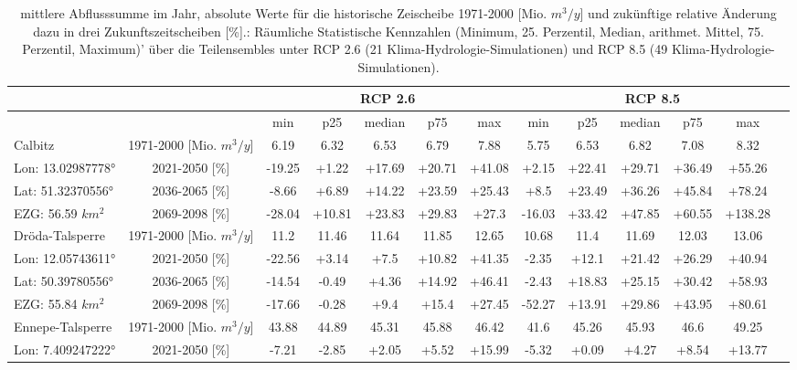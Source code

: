 \renewcommand{\arraystretch}{1.2}
\addtolength{\tabcolsep}{-5.9pt}
\scriptsize
\begin{longtable}{@{\extracolsep{\fill}}lc|ccccc||cccccc}
\caption{mittlere Abflusssumme im Jahr, absolute Werte für die historische Zeischeibe 1971-2000 [Mio. $m^3/y$] und zukünftige relative Änderung dazu in drei Zukunftszeitscheiben [\%].: Räumliche Statistische Kennzahlen (Minimum, 25. Perzentil, Median, arithmet. Mittel, 75. Perzentil, Maximum)' über die Teilensembles unter RCP 2.6 (21 Klima-Hydrologie-Simulationen) und RCP 8.5 (49 Klima-Hydrologie-Simulationen).}\\  \hline
\multicolumn{2}{c}{} & \multicolumn{5}{c||}{RCP 2.6}  & \multicolumn{6}{c}{RCP 8.5}\\ \hline
\multicolumn{2}{c|}{} & min & p25 & median & p75 & max & min & p25 & median & p75 & max\\ 
\hline 
Calbitz & 1971-2000 [Mio. $m^3/y$]  & 6.19 & 6.32 & 6.53 & 6.79 & 7.88 & 5.75 & 6.53 & 6.82 & 7.08 & 8.32 & \\ 
\cline{2-13} 
Lon: 13.02987778° & 2021-2050 [\%]  & -19.25 & +1.22 & +17.69 & +20.71 & +41.08 & +2.15 & +22.41 & +29.71 & +36.49 & +55.26 & \\ 
Lat: 51.32370556° & 2036-2065 [\%]  & -8.66 & +6.89 & +14.22 & +23.59 & +25.43 & +8.5 & +23.49 & +36.26 & +45.84 & +78.24 & \\ 
EZG: 56.59 $km^2$ & 2069-2098 [\%]  & -28.04 & +10.81 & +23.83 & +29.83 & +27.3 & -16.03 & +33.42 & +47.85 & +60.55 & +138.28 & \\ 
\hline 
Dröda-Talsperre & 1971-2000 [Mio. $m^3/y$]  & 11.2 & 11.46 & 11.64 & 11.85 & 12.65 & 10.68 & 11.4 & 11.69 & 12.03 & 13.06 & \\ 
\cline{2-13} 
Lon: 12.05743611° & 2021-2050 [\%]  & -22.56 & +3.14 & +7.5 & +10.82 & +41.35 & -2.35 & +12.1 & +21.42 & +26.29 & +40.94 & \\ 
Lat: 50.39780556° & 2036-2065 [\%]  & -14.54 & -0.49 & +4.36 & +14.92 & +46.41 & -2.43 & +18.83 & +25.15 & +30.42 & +58.93 & \\ 
EZG: 55.84 $km^2$ & 2069-2098 [\%]  & -17.66 & -0.28 & +9.4 & +15.4 & +27.45 & -52.27 & +13.91 & +29.86 & +43.95 & +80.61 & \\ 
\hline 
Ennepe-Talsperre & 1971-2000 [Mio. $m^3/y$]  & 43.88 & 44.89 & 45.31 & 45.88 & 46.42 & 41.6 & 45.26 & 45.93 & 46.6 & 49.25 & \\ 
\cline{2-13} 
Lon: 7.409247222° & 2021-2050 [\%]  & -7.21 & -2.85 & +2.05 & +5.52 & +15.99 & -5.32 & +0.09 & +4.27 & +8.54 & +13.77 & \\ 

\end{longtable}
